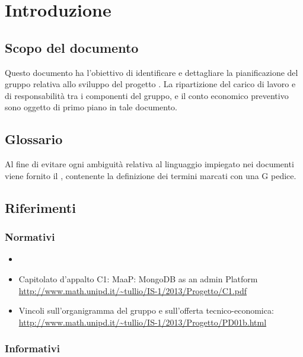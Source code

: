 \section{Introduzione}

	\subsection{Scopo del documento}

Questo documento ha l'obiettivo di identificare e dettagliare la pianificazione del gruppo \GroupName{} relativa allo sviluppo del progetto \ProjectName{}. La ripartizione del carico di lavoro e di responsabilità tra i componenti del gruppo, e il conto economico preventivo sono oggetto di primo piano in tale documento.

	\subsection{Glossario}

Al fine di evitare ogni ambiguità relativa al linguaggio impiegato nei documenti viene fornito il \Glossario{} , contenente la definizione dei termini marcati con una G pedice.	
	
	\subsection{Riferimenti}
	
		\subsubsection{Normativi}
		
		\begin{itemize}
		\item \NormeDiProgetto
		\item Capitolato d'appalto C1: MaaP: MongoDB as an admin Platform\\
			\url{http://www.math.unipd.it/~tullio/IS-1/2013/Progetto/C1.pdf}
		\item Vincoli sull'organigramma del gruppo e sull'offerta tecnico-economica:\\
			\url{http://www.math.unipd.it/~tullio/IS-1/2013/Progetto/PD01b.html}
        \end{itemize}
        
		\subsubsection{Informativi}
		
